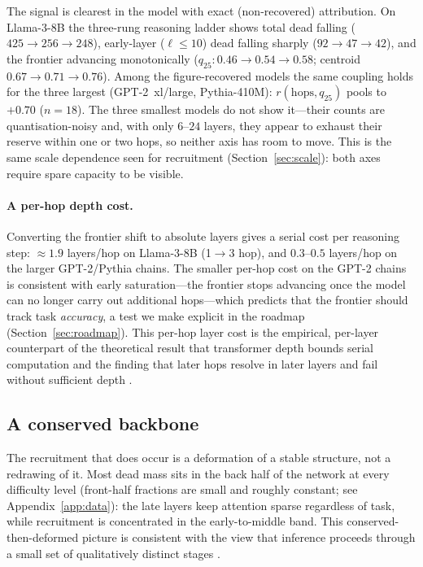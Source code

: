 \documentclass[11pt]{article}
\begin{document}
The signal is clearest in the model with exact (non-recovered) attribution.
On Llama-3-8B the three-rung reasoning ladder shows total dead falling
($425\to256\to248$), early-layer ($\ell\!\le\!10$) dead falling sharply
($92\to47\to42$), and the frontier advancing monotonically
($q_{25}: 0.46\to0.54\to0.58$; centroid $0.67\to0.71\to0.76$). Among the
figure-recovered models the same coupling holds for the three largest
(GPT-2~xl/large, Pythia-410M): $r(\text{hops},q_{25})$ pools to $+0.70$
($n{=}18$). The three smallest models do not show it---their counts are
quantisation-noisy and, with only $6$--$24$ layers, they appear to exhaust
their reserve within one or two hops, so neither axis has room to move. This
is the same scale dependence seen for recruitment (Section~\ref{sec:scale}):
both axes require spare capacity to be visible.

\paragraph{A per-hop depth cost.}
Converting the frontier shift to absolute layers gives a serial cost per
reasoning step: $\approx1.9$ layers/hop on Llama-3-8B (1$\to$3 hop), and
$0.3$--$0.5$ layers/hop on the larger GPT-2/Pythia chains. The smaller
per-hop cost on the GPT-2 chains is consistent with early saturation---the
frontier stops advancing once the model can no longer carry out additional
hops---which predicts that the frontier should track task \emph{accuracy}, a
test we make explicit in the roadmap (Section~\ref{sec:roadmap}). This
per-hop layer cost is the empirical, per-layer counterpart of the theoretical
result that transformer depth bounds serial computation
\citep{merrill2023parallelism,li2024chain} and the finding that later hops
resolve in later layers and fail without sufficient depth
\citep{yang2024large,biran2024hopping}.

\subsection{A conserved backbone}\label{sec:skeleton}
The recruitment that does occur is a deformation of a stable structure, not a
redrawing of it. Most dead mass sits in the back half of the network at every
difficulty level (front-half fractions are small and roughly constant; see
Appendix~\ref{app:data}): the late layers keep attention sparse regardless of
task, while recruitment is concentrated in the early-to-middle band. This
conserved-then-deformed picture is consistent with the view that inference
proceeds through a small set of qualitatively distinct stages
\citep{lad2024remarkable}.
\end{document}
